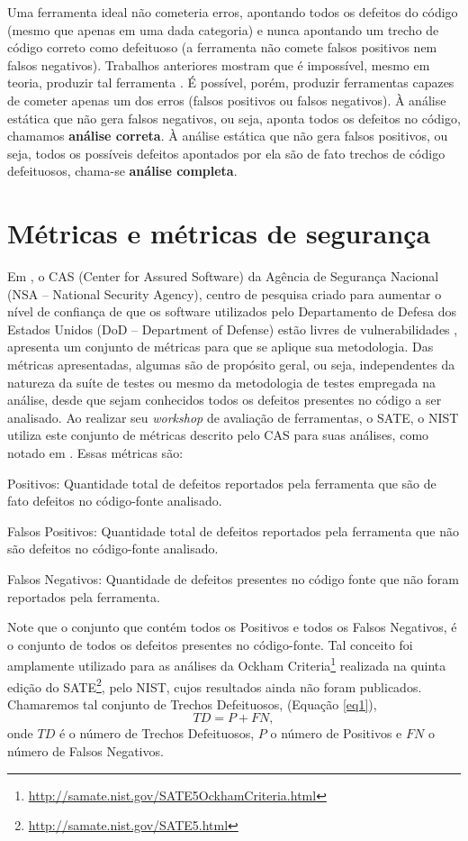 Uma ferramenta ideal não cometeria erros, apontando todos os defeitos do código (mesmo que apenas em uma dada categoria) e nunca apontando um trecho de código correto como defeituoso (a ferramenta não comete falsos positivos nem falsos negativos). Trabalhos anteriores mostram que é impossível, mesmo em teoria, produzir tal ferramenta \cite{sa_spec}. É possível, porém, produzir ferramentas capazes de cometer apenas um dos erros (falsos positivos ou falsos negativos). À análise estática que não gera falsos negativos, ou seja, aponta todos os defeitos no código, chamamos \textbf{análise correta}. À análise estática que não gera falsos positivos, ou seja, todos os possíveis defeitos apontados por ela são de fato trechos de código defeituosos, chama-se \textbf{análise completa}.

\section{Métricas e métricas de segurança}

Em \cite{nsa}, o CAS (Center for Assured Software) da Agência de Segurança Nacional (NSA – National Security Agency), centro de pesquisa criado para aumentar o nível de confiança de que os software utilizados pelo Departamento de Defesa dos Estados Unidos (DoD – Department of Defense) estão livres de vulnerabilidades \cite{nsa}, apresenta um conjunto de métricas para que se aplique sua metodologia. Das métricas apresentadas, algumas são de propósito geral, ou seja, independentes da natureza da suíte de testes ou mesmo da metodologia de testes empregada na análise, desde que sejam conhecidos todos os defeitos presentes no código a ser analisado. Ao realizar seu \textit{workshop} de avaliação de ferramentas, o SATE, o NIST utiliza este conjunto de métricas descrito pelo CAS para suas análises, como notado em \cite{sate_iv}. Essas métricas são:

Positivos: Quantidade total de defeitos reportados pela ferramenta que são de fato defeitos no código-fonte analisado.

Falsos Positivos: Quantidade total de defeitos reportados pela ferramenta que não são defeitos no código-fonte analisado.

Falsos Negativos: Quantidade de defeitos presentes no código fonte que não foram reportados pela ferramenta.

Note que o conjunto que contém todos os Positivos e todos os Falsos Negativos, é o conjunto de todos os defeitos presentes no código-fonte. Tal conceito foi amplamente utilizado para as análises da Ockham Criteria\footnote{\url{http://samate.nist.gov/SATE5OckhamCriteria.html}} realizada na quinta edição do SATE\footnote{\url{http://samate.nist.gov/SATE5.html}}, pelo NIST, cujos resultados ainda não foram publicados. Chamaremos tal conjunto de Trechos Defeituosos, (Equação \eqref{eq1}),
\begin{equation}\label{eq1}
TD = P + FN,
\end{equation}
  onde $TD$ é o número de Trechos Defeituosos, $P$ o número de Positivos e $FN$ o número de Falsos Negativos.

